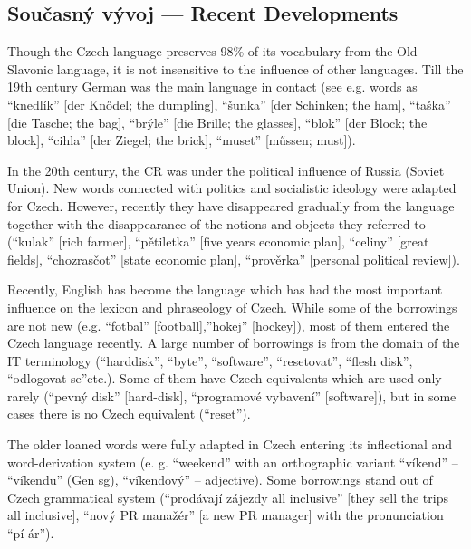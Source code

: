 \documentclass[]{../../metanetpaper}
\begin{document}
\begin{multicols}{2}
\subsection{Současný vývoj --- Recent Developments}

Though the Czech language preserves 98\% of its vocabulary from the Old Slavonic language, it is not insensitive to the influence of other languages.\cite{Note5} Till the 19th century German was the main language in contact (see e.g. words as “knedlík” {[}der Knődel; the dumpling{]}, “šunka” {[}der Schinken; the ham{]}, “taška” {[}die Tasche; the bag{]}, “brýle” {[}die Brille; the glasses{]}, “blok” {[}der Block; the block{]}, “cihla” {[}der Ziegel; the brick{]}, “muset” {[}műssen; must{]}).

In the 20th century, the CR was under the political influence of Russia (Soviet Union). New words connected with politics and socialistic ideology were adapted for Czech. However, recently they have disappeared gradually from the language together with the disappearance of the notions and objects they referred to (“kulak” {[}rich farmer{]}, “pětiletka” {[}five years economic plan{]}, “celiny” {[}great fields{]}, “chozrasčot” {[}state economic plan{]},  “prověrka” {[}personal political review{]}).

Recently, English has become the language which has had the most important influence on the lexicon and phraseology of Czech. While some of the borrowings are not new (e.g. “fotbal” {[}football{]},”hokej” {[}hockey{]}), most of them entered the Czech language recently. A large number of borrowings is from the domain of the IT terminology (“harddisk”, “byte”, “software”, “resetovat”, “flesh disk”, “odlogovat se”etc.). Some of them have Czech equivalents which are used only rarely (“pevný disk” {[}hard-disk{]}, “programové vybavení” {[}software{]}), but in some cases there is no Czech equivalent (“reset”).

The older loaned words were fully adapted in Czech entering its inflectional and word-derivation system (e. g. “weekend” with an orthographic variant “víkend” – “víkendu” (Gen sg), “víkendový” – adjective). Some borrowings stand out of Czech grammatical system (“prodávají zájezdy all inclusive” {[}they sell the trips all inclusive{]}, “nový PR manažér” {[}a new PR manager{]} with the pronunciation “pí-ár”).


\end{multicols}
\end{document}
